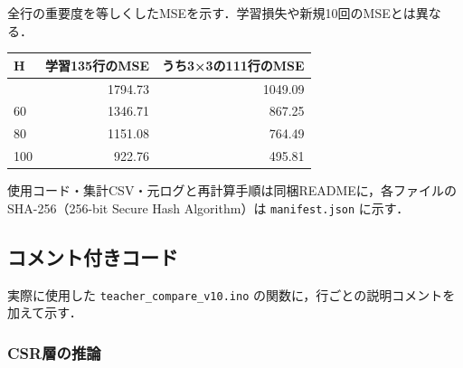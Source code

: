 \documentclass[
  10pt,
  a4paper,
]{article}
\begin{document}
全行の重要度を等しくしたMSEを示す．学習損失や新規10回のMSEとは異なる．

\begin{longtable}[]{@{}lrr@{}}
\toprule\noalign{}
H & 学習135行のMSE & うち3×3の111行のMSE \\
\midrule\noalign{}
\endhead
\bottomrule\noalign{}
\endlastfoot
40 & 1794.73 & 1049.09 \\
60 & 1346.71 & 867.25 \\
80 & 1151.08 & 764.49 \\
100 & 922.76 & 495.81 \\
\end{longtable}

使用コード・集計CSV・元ログと再計算手順は同梱READMEに，各ファイルのSHA-256（256-bit
Secure Hash Algorithm）は \texttt{manifest.json} に示す．

\subsection{コメント付きコード}\label{ux30b3ux30e1ux30f3ux30c8ux4ed8ux304dux30b3ux30fcux30c9}

実際に使用した \texttt{teacher\_compare\_v10.ino}
の関数に，行ごとの説明コメントを加えて示す．


\subsubsection{CSR層の推論}\label{csrux5c64ux306eux63a8ux8ad6}
\end{document}
